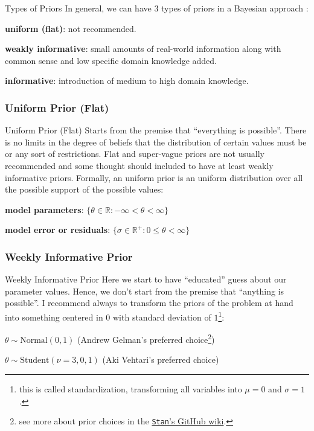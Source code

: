 \begin{frame}{Types of Priors}
	In general, we can have 3 types of priors in a Bayesian approach
	\parencite{gelman2013bayesian, mcelreath2020statistical, vandeschootBayesianStatisticsModelling2021}:
	\begin{vfilleditems}
		\item \textbf{uniform (flat)}: not recommended.
		\item \textbf{weakly informative}: small amounts of real-world information
		along with common sense and low specific domain knowledge added.
		\item \textbf{informative}: introduction of medium to high domain knowledge.
	\end{vfilleditems}
\end{frame}

\subsubsection{Uniform Prior (Flat)}
\begin{frame}{Uniform Prior (Flat)}
	Starts from the premise that ``everything is possible''.
	There is no limits in the degree of beliefs that the distribution of certain
	values must be or any sort of restrictions.
	\vfill
	Flat and super-vague priors are not usually recommended and some thought
	should included to have at least weakly informative priors.
	\vfill
	Formally, an uniform prior is an uniform distribution over all the
	possible support of the possible values:
	\begin{vfilleditems}
		\item \textbf{model parameters}: $\{\theta \in \mathbb{R} : -\infty < \theta < \infty\}$
		\item \textbf{model error or residuals}: $\{\sigma \in \mathbb{R}^+ : 0 \leq \theta < \infty\}$
	\end{vfilleditems}
\end{frame}

\subsubsection{Weekly Informative Prior}
\begin{frame}{Weekly Informative Prior}
	Here we start to have ``educated'' guess about our parameter values.
	Hence, we don't start from the premise that ``anything is possible''.
	\vfill
	I recommend always to transform the priors of the problem at hand into
	something centered in $0$ with standard deviation of $1$\footnote{
		this is called standardization,
		transforming all variables into $\mu=0$ and $\sigma=1$.}:
	\vfill
	\begin{vfilleditems}
		\item $\theta \sim \text{Normal}(0, 1)$ (Andrew Gelman's preferred choice\footnote{
			see more about prior choices in the
			\href{https://github.com/stan-dev/stan/wiki/Prior-Choice-Recommendations}{\texttt{Stan}'s GitHub wiki}.})
		\item $\theta \sim \text{Student}(\nu=3, 0, 1)$ (Aki Vehtari's preferred choice)
	\end{vfilleditems}
\end{frame}
